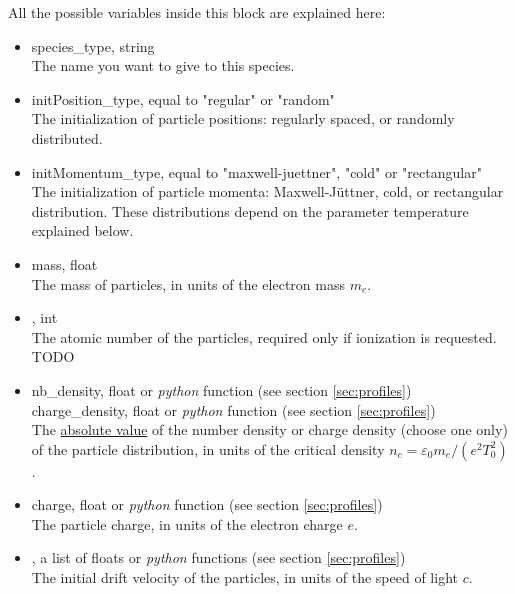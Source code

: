 \documentclass[11pt]{article}
\newcommand{\code}[1]{\colorbox{yellow!15}{\ttfamily #1}}
\newcommand{\blue}[1]{{\color{blue} #1}}
\newcommand{\python}{\emph{python}\xspace}
\newcommand{\todo}{{\color{red}TODO}}
\begin{document}
All the possible variables inside this block are explained here:
\vspace{-10pt}
\begin{itemize}

\item \code{species\_type}, string\\
The name you want to give to this species.

\item \code{initPosition\_type}, equal to \code{"regular"} or \code{"random"}\\
The initialization of particle positions: regularly spaced, or randomly distributed.

\item \code{initMomentum\_type}, equal to \code{"maxwell-juettner"}, \code{"cold"} or \code{"rectangular"}\\
The initialization of particle momenta: Maxwell-J\"uttner, cold, or rectangular distribution.
These distributions depend on the parameter \code{temperature} explained below.

\item \code{mass}, float\\
The mass of particles, in units of the electron mass $m_e$.

\item \code{\blue{atomic\_number}}, int\\
The atomic number of the particles, required only if ionization is requested. \todo

\item \code{nb\_density}, float or \python function (see section \ref{sec:profiles})\\
\code{charge\_density}, float or \python function (see section \ref{sec:profiles})\\
The \underline{absolute value} of the number density or charge density (choose one only) of the particle distribution, 
in units of the critical density $n_c=\varepsilon_0 m_e/(e^2 T_0^2)$.

\item \code{charge}, float or \python function (see section \ref{sec:profiles})\\
The particle charge, in units of the electron charge $e$.

\item \code{\blue{mean\_velocity}}, a list of floats or \python functions (see section \ref{sec:profiles})\\
The initial drift velocity of the particles, in units of the speed of light $c$.


\end{itemize}
\end{document}
